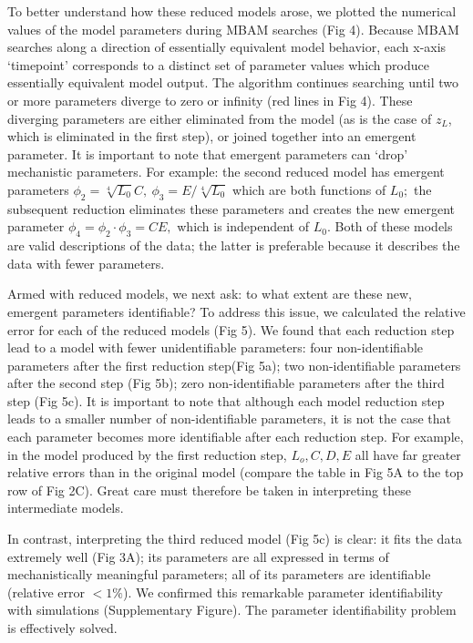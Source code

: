 \documentclass[10pt]{amsart}
\newcommand{\lo}{L_o}
\newcommand{\zl}{z_L}
\begin{document}
To better understand how these reduced models arose, we plotted the numerical values of the model parameters during MBAM searches (Fig 4).  Because MBAM searches along a direction of essentially equivalent model behavior, each x-axis `timepoint' corresponds to a distinct set of parameter values which produce essentially equivalent model output.  The algorithm continues searching until two or more parameters diverge to zero or infinity (red lines in Fig 4).  These diverging parameters are either eliminated from the model (as is the case of $\zl$, which is eliminated in the first step), or joined together into an emergent parameter.  It is important to note that emergent parameters can `drop' mechanistic parameters.  For example: the second reduced model has emergent parameters $\phi_2=\sqrt[4]{L_0}C, \ \phi_3=E/\sqrt[4]{L_0}$ which are both functions of $L_0;$ the subsequent reduction eliminates these parameters and creates the new emergent parameter $\phi_4=\phi_2\cdot\phi_3=CE,$ which is independent of $L_0.$  Both of these models are valid descriptions of the data; the latter is preferable because it describes the data with fewer parameters.

Armed with reduced models, we next ask: to what extent are these new, emergent parameters identifiable?  To address this issue, we calculated the relative error for each of the reduced models (Fig 5).  We found that each reduction step lead to a model with fewer unidentifiable parameters: four non-identifiable parameters after the first reduction step(Fig 5a); two non-identifiable parameters after the second step (Fig 5b); zero non-identifiable parameters after the third step (Fig 5c).  It is important to note that although each model reduction step leads to a smaller number of non-identifiable parameters, it is not the case that each parameter becomes more identifiable after each reduction step.  For example, in the model produced by the first reduction step, $\lo, C, D, E$ all have far greater relative errors than in the original model (compare the table in Fig 5A to the top row of Fig 2C).  Great care must therefore be taken in interpreting these intermediate models.

In contrast, interpreting the third reduced model (Fig 5c) is clear: it fits the data extremely well (Fig 3A); its parameters are all expressed in terms of mechanistically meaningful parameters; all of its parameters are identifiable (relative error $<1\%$).  We confirmed this remarkable parameter identifiability with simulations (Supplementary Figure).  The parameter identifiability problem is effectively solved.
\end{document}
